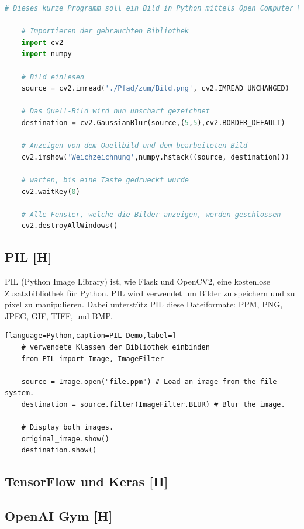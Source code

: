 \begin{lstlisting}[language=Python,caption=OpenCV Demo,label=lst:tech:gaussianBlur]
    # Dieses kurze Programm soll ein Bild in Python mittels Open Computer Vision weichzeichnen
    
    # Importieren der gebrauchten Bibliothek
    import cv2
    import numpy
    
    # Bild einlesen
    source = cv2.imread('./Pfad/zum/Bild.png', cv2.IMREAD_UNCHANGED)
    
    # Das Quell-Bild wird nun unscharf gezeichnet
    destination = cv2.GaussianBlur(source,(5,5),cv2.BORDER_DEFAULT)

    # Anzeigen von dem Quellbild und dem bearbeiteten Bild 
    cv2.imshow('Weichzeichnung',numpy.hstack((source, destination)))

    # warten, bis eine Taste gedrueckt wurde
    cv2.waitKey(0) 

    # Alle Fenster, welche die Bilder anzeigen, werden geschlossen
    cv2.destroyAllWindows() 
\end{lstlisting}

\subsection{PIL [H]}
PIL (Python Image Library) ist, wie Flask und OpenCV2, eine kostenlose Zusatzbibliothek für Python.
PIL wird verwendet um Bilder zu speichern und zu pixel zu manipulieren. Dabei unterstütz PIL diese
Dateiformate: PPM, PNG, JPEG, GIF, TIFF, und BMP. \\



\begin{lstlisting}[language=Python,caption=PIL Demo,label=]
    # verwendete Klassen der Bibliothek einbinden
    from PIL import Image, ImageFilter  

    source = Image.open("file.ppm") # Load an image from the file system.
    destination = source.filter(ImageFilter.BLUR) # Blur the image.

    # Display both images.
    original_image.show() 
    destination.show()
\end{lstlisting}



\subsection{TensorFlow und Keras [H]}

\subsection{OpenAI Gym [H]}
